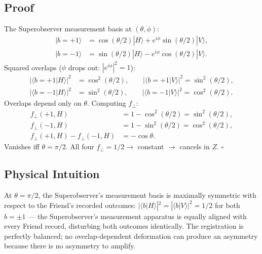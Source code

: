 \documentclass[twocolumn,aps,pra,superscriptaddress,floatfix,10pt]{revtex4-2}
\begin{document}
\subsection{Proof}
\label{sec:proof}

The Superobserver measurement basis at $(\theta, \phi)$:
\begin{align}
|b=+1\rangle &= \cos(\theta/2)|H\rangle + e^{i\phi}\sin(\theta/2)|V\rangle,
\label{eq:basis_p} \\
|b=-1\rangle &= \sin(\theta/2)|H\rangle - e^{i\phi}\cos(\theta/2)|V\rangle.
\label{eq:basis_m}
\end{align}
Squared overlaps ($\phi$ drops out: $|e^{i\phi}|^2 = 1$):
\begin{align}
|\langle b=+1|H\rangle|^2 &= \cos^2(\theta/2), \qquad
|\langle b=+1|V\rangle|^2 = \sin^2(\theta/2),
\label{eq:overlap_p} \\
|\langle b=-1|H\rangle|^2 &= \sin^2(\theta/2), \qquad
|\langle b=-1|V\rangle|^2 = \cos^2(\theta/2).
\label{eq:overlap_m}
\end{align}
Overlaps depend only on $\theta$. Computing $f_\perp$:
\begin{align}
f_\perp(+1, H) &= 1 - \cos^2(\theta/2) = \sin^2(\theta/2),
\label{eq:fp} \\
f_\perp(-1, H) &= 1 - \sin^2(\theta/2) = \cos^2(\theta/2),
\label{eq:fm} \\
f_\perp(+1, H) - f_\perp(-1, H) &= -\cos\theta.
\label{eq:diff}
\end{align}
Vanishes iff $\theta = \pi/2$. All four $f_\perp = 1/2 \to$ constant $\to$ cancels in $Z$. $\square$

\subsection{Physical Intuition}
\label{sec:intuition}

At $\theta = \pi/2$, the Superobserver's measurement basis is maximally symmetric
with respect to the Friend's recorded outcomes:
$|\langle b|H\rangle|^2 = |\langle b|V\rangle|^2 = 1/2$ for both $b = \pm 1$ --- the Superobserver's measurement
apparatus is equally aligned with every Friend record, disturbing both
outcomes identically. The registration is perfectly balanced; no
overlap-dependent deformation can produce an asymmetry because there is
no asymmetry to amplify.
\end{document}
